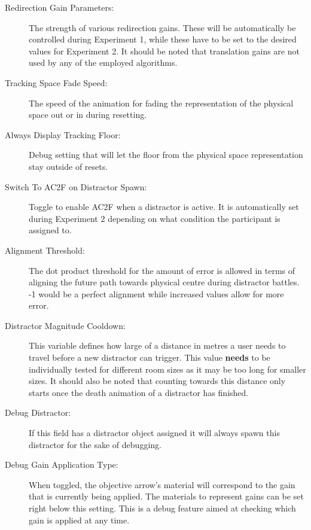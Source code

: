 \begin{description}
   \item[Redirection Gain Parameters:] The strength of various redirection gains. These will be automatically be controlled during Experiment 1, while these have to be set to the desired values for Experiment 2. It should be noted that translation gains are not used by any of the employed algorithms.
   \item[Tracking Space Fade Speed:] The speed of the animation for fading the representation of the physical space out or in during resetting.
   \item[Always Display Tracking Floor:] Debug setting that will let the floor from the physical space representation stay outside of resets.
   \item[Switch To AC2F on Distractor Spawn:] Toggle to enable AC2F when a distractor is active. It is automatically set during Experiment 2 depending on what condition the participant is assigned to. 
   \item[Alignment Threshold:] The dot product threshold for the amount of error is allowed in terms of aligning the future path towards physical centre during distractor battles. -1 would be a perfect alignment while increased values allow for more error. 
   \item[Distractor Magnitude Cooldown:] This variable defines how large of a distance in metres a user needs to travel before a new distractor can trigger. This value \textbf{needs} to be individually tested for different room sizes as it may be too long for smaller sizes. It should also be noted that counting towards this distance only starts once the death animation of a distractor has finished. 
   \item[Debug Distractor:] If this field has a distractor object assigned it will always spawn this distractor for the sake of debugging. 
   \item[Debug Gain Application Type:] When toggled, the objective arrow's material will correspond to the gain that is currently being applied. The materials to represent gains can be set right below this setting. This is a debug feature aimed at checking which gain is applied at any time. 
\end{description}

